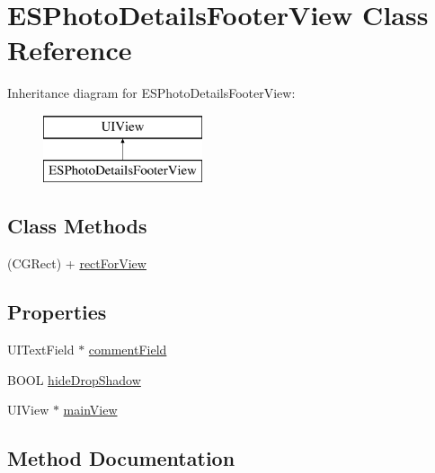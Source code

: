 \hypertarget{interface_e_s_photo_details_footer_view}{}\section{E\+S\+Photo\+Details\+Footer\+View Class Reference}
\label{interface_e_s_photo_details_footer_view}
Inheritance diagram for E\+S\+Photo\+Details\+Footer\+View\+:\begin{figure}[H]
\begin{center}
\leavevmode
\includegraphics[height=2.000000cm]{interface_e_s_photo_details_footer_view}
\end{center}
\end{figure}
\subsection*{Class Methods}
\begin{DoxyCompactItemize}
\item 
(C\+G\+Rect) + \hyperlink{interface_e_s_photo_details_footer_view_a69549057f20c69287f6b741947462f37}{rect\+For\+View}
\end{DoxyCompactItemize}
\subsection*{Properties}
\begin{DoxyCompactItemize}
\item 
U\+I\+Text\+Field $\ast$ \hyperlink{interface_e_s_photo_details_footer_view_a818ee230ae7ac1791492c52c54f7105c}{comment\+Field}
\item 
B\+O\+O\+L \hyperlink{interface_e_s_photo_details_footer_view_aa275a8a30ec57c7bcaf1df2e726daafc}{hide\+Drop\+Shadow}
\item 
U\+I\+View $\ast$ \hyperlink{interface_e_s_photo_details_footer_view_abd619c89f3b9b44e205cbffd054511e6}{main\+View}
\end{DoxyCompactItemize}


\subsection{Method Documentation}
\hypertarget{interface_e_s_photo_details_footer_view_a69549057f20c69287f6b741947462f37}{}
